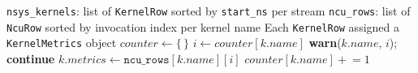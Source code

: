 \begin{algorithm}[t]
\caption{Invocation-Order Matching (\nsys $\times$ \ncu)}
\label{alg:iom}
\begin{algorithmic}[1]
\Require \texttt{nsys\_kernels}: list of \texttt{KernelRow} sorted by \texttt{start\_ns} per stream
\Require \texttt{ncu\_rows}: list of \texttt{NcuRow} sorted by invocation index per kernel name
\Ensure  Each \texttt{KernelRow} assigned a \texttt{KernelMetrics} object
\State $\textit{counter} \gets \{\,\}$
  \State $i \gets \textit{counter}[k.\textit{name}]$
    \State \textbf{warn}($k.\textit{name}$, $i$); \textbf{continue}
  \EndIf
  \State $k.\textit{metrics} \gets \texttt{ncu\_rows}[k.\textit{name}][i]$
  \State $\textit{counter}[k.\textit{name}] \mathrel{+}= 1$
\EndFor
\end{algorithmic}
\end{algorithm}

